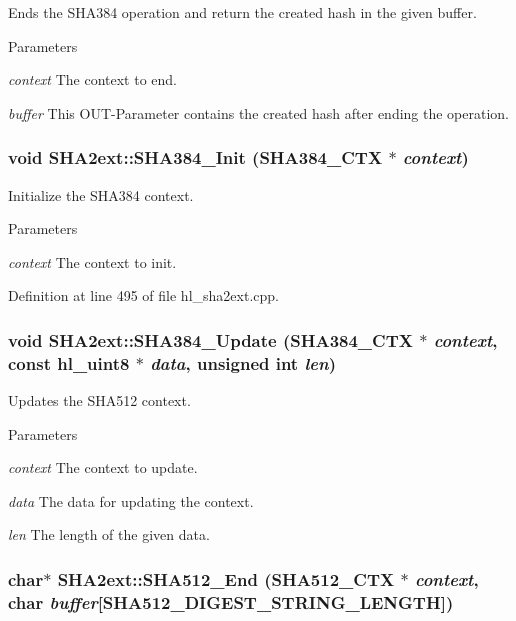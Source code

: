Ends the SHA384 operation and return the created hash in the given buffer. 
\begin{DoxyParams}{Parameters}
\item[{\em context}]The context to end. \item[{\em buffer}]This OUT-\/Parameter contains the created hash after ending the operation. \end{DoxyParams}
\hypertarget{class_s_h_a2ext_a9d1e59ec49bf28e9ce1b059e0d34492b}{
\subsubsection[{SHA384\_\-Init}]{\setlength{\rightskip}{0pt plus 5cm}void SHA2ext::SHA384\_\-Init ({\bf SHA384\_\-CTX} $\ast$ {\em context})}}
\label{class_s_h_a2ext_a9d1e59ec49bf28e9ce1b059e0d34492b}


Initialize the SHA384 context. 
\begin{DoxyParams}{Parameters}
\item[{\em context}]The context to init. \end{DoxyParams}


Definition at line 495 of file hl\_\-sha2ext.cpp.\hypertarget{class_s_h_a2ext_a910da8d255cde7a69d0149c7ad15fce3}{
\subsubsection[{SHA384\_\-Update}]{\setlength{\rightskip}{0pt plus 5cm}void SHA2ext::SHA384\_\-Update ({\bf SHA384\_\-CTX} $\ast$ {\em context}, \/  const {\bf hl\_\-uint8} $\ast$ {\em data}, \/  unsigned int {\em len})}}
\label{class_s_h_a2ext_a910da8d255cde7a69d0149c7ad15fce3}


Updates the SHA512 context. 
\begin{DoxyParams}{Parameters}
\item[{\em context}]The context to update. \item[{\em data}]The data for updating the context. \item[{\em len}]The length of the given data. \end{DoxyParams}
\hypertarget{class_s_h_a2ext_aa1d46fec9075d0b36397aa010b4329fb}{
\subsubsection[{SHA512\_\-End}]{\setlength{\rightskip}{0pt plus 5cm}char$\ast$ SHA2ext::SHA512\_\-End ({\bf SHA512\_\-CTX} $\ast$ {\em context}, \/  char {\em buffer}\mbox{[}SHA512\_\-DIGEST\_\-STRING\_\-LENGTH\mbox{]})}}
\label{class_s_h_a2ext_aa1d46fec9075d0b36397aa010b4329fb}


